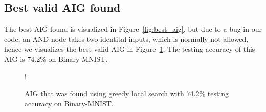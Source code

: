 \subsection{Best valid AIG found} \label{app:aig}
The best AIG found is visualized in Figure~\ref{fig:best_aig}, but due to a bug in our code, an AND node takes two identital inputs, which is normally not allowed, hence we visualizes the best valid AIG in Figure~\ref{fig:aig-mnist}. The testing accuracy of this AIG is 74.2\% on Binary-MNIST.

\begin{figure}[!htb]
    \centering
    \resizebox {0.45\textwidth} {!} {
      
    }
      \caption{AIG that was found using greedy local search with 74.2\% testing accuracy on Binary-MNIST.}
\label{fig:aig-mnist}
\end{figure}
\FloatBarrier
